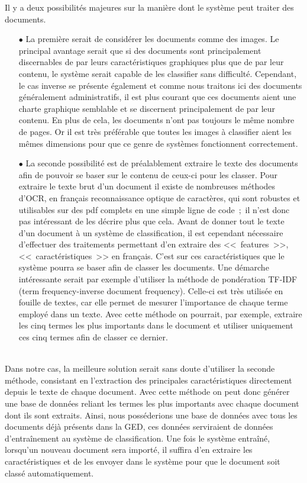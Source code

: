 Il y a deux possibilités majeures sur la manière dont le système peut traiter des documents.
\\
\begin{itemize}
    \item[\tiny$\bullet$] La première serait de considérer les documents comme des images.
    Le principal avantage serait que si des documents sont principalement discernables de par leurs caractéristiques graphiques plus que de par leur contenu, le système serait capable de les classifier sans difficulté.
    Cependant, le cas inverse se présente également et comme nous traitons ici des documents généralement administratifs, il est plus courant que ces documents aient une charte graphique semblable et se discernent principalement de par leur contenu.
    En plus de cela, les documents n'ont pas toujours le même nombre de pages. Or il est très préférable que toutes les images à classifier aient les mêmes dimensions pour que ce genre de systèmes fonctionnent correctement.
    
    \item[\tiny$\bullet$] La seconde possibilité est de préalablement extraire le texte des documents afin de pouvoir se baser sur le contenu de ceux-ci pour les classer.
    Pour extraire le texte brut d'un document il existe de nombreuses méthodes d'OCR, en français reconnaissance optique de caractères, qui sont robustes et utilisables sur des pdf complets en une simple ligne de code~;~il n'est donc pas intéressant de les décrire plus que cela.
    Avant de donner tout le texte d'un document à un système de classification, il est cependant nécessaire d'effectuer des traitements permettant d'en extraire des <<~features~>>, <<~caractéristiques~>> en français.
    C'est sur ces caractéristiques que le système pourra se baser afin de classer les documents.
    Une démarche intéressante serait par exemple d'utiliser la méthode de pondération TF-IDF (term frequency-inverse document frequency).
    Celle-ci est très utilisée en fouille de textes, car elle permet de mesurer l'importance de chaque terme employé dans un texte.
    Avec cette méthode on pourrait, par exemple, extraire les cinq termes les plus importants dans le document et utiliser uniquement ces cinq termes afin de classer ce dernier.
\end{itemize}
~\\

Dans notre cas, la meilleure solution serait sans doute d'utiliser la seconde méthode, consistant en l'extraction des principales caractéristiques directement depuis le texte de chaque document.
Avec cette méthode on peut donc générer une base de données reliant les termes les plus importants avec chaque document dont ils sont extraits.
Ainsi, nous posséderions une base de données avec tous les documents déjà présents dans la GED, ces données serviraient de données d'entraînement au système de classification.
Une fois le système entraîné, lorsqu'un nouveau document sera importé, il suffira d'en extraire les caractéristiques et de les envoyer dans le système pour que le document soit classé automatiquement.

